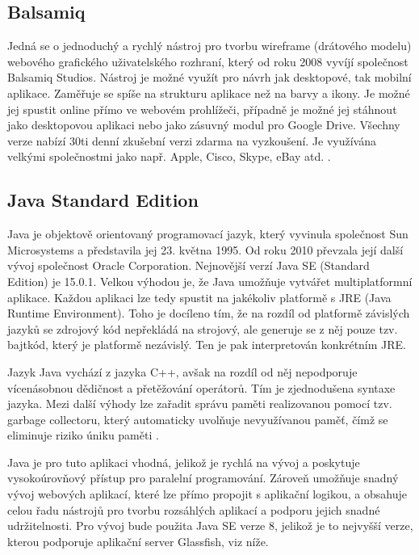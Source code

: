 \subsection*{Balsamiq}
\label{subsection:technology_Balsamiq}
Jedná se o jednoduchý a rychlý nástroj pro tvorbu wireframe (drátového modelu) webového grafického uživatelského rozhraní, který od roku 2008 vyvíjí společnost Balsamiq Studios. Nástroj je možné využít pro návrh jak desktopové, tak mobilní aplikace. Zaměřuje se spíše na strukturu aplikace než na barvy a ikony. Je možné jej spustit online přímo ve webovém prohlížeči, případně je možné jej stáhnout jako desktopovou aplikaci nebo jako zásuvný modul pro Google Drive. Všechny verze nabízí 30ti denní zkušební verzi zdarma na vyzkoušení. Je využívána velkými společnostmi jako např. Apple, Cisco, Skype, eBay atd. \cite{Technology_Balsamiq}.

\subsection*{Java Standard Edition}

Java je objektově orientovaný programovací jazyk, který vyvinula společnost Sun Microsystems a představila jej 23. května 1995. Od roku 2010 převzala její další vývoj společnost Oracle Corporation. Nejnovější verzí Java SE (Standard Edition) je 15.0.1. Velkou výhodou je, že Java umožňuje vytvářet multiplatformní aplikace. Každou aplikaci lze tedy spustit na jakékoliv platformě s JRE (Java Runtime Environment). Toho je docíleno tím, že na rozdíl od platformě závislých jazyků se zdrojový kód nepřekládá na strojový, ale generuje se z něj pouze tzv. bajtkód, který je platformě nezávislý. Ten je pak interpretován konkrétním JRE. 

Jazyk Java vychází z jazyka C++, avšak na rozdíl od něj nepodporuje vícenásobnou dědičnost a přetěžování operátorů. Tím je zjednodušena syntaxe jazyka. Mezi další výhody lze zařadit správu paměti realizovanou pomocí tzv. garbage collectoru, který automaticky uvolňuje nevyužívanou paměť, čímž se eliminuje riziko úniku paměti \cite{Technology_Java}.

Java je pro tuto aplikaci vhodná, jelikož je rychlá na vývoj a poskytuje vysokoúrovňový přístup pro paralelní programování. Zároveň umožňuje snadný vývoj webových aplikací, které lze přímo propojit s aplikační logikou, a obsahuje celou řadu nástrojů pro tvorbu rozsáhlých aplikací a podporu jejich snadné udržitelnosti. Pro vývoj bude použita Java SE verze 8, jelikož je to nejvyšší verze, kterou podporuje aplikační server Glassfish, viz níže.


